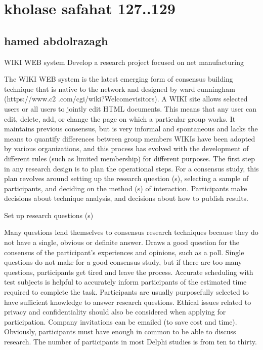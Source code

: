 \documentclass [7pt]{beamer}
\begin{document}
\small
\section*{kholase safahat 127..129 }
\subsection*{hamed abdolrazagh }	
\begin{frame}
\justifying	
WIKI WEB system  Develop a research project focused on net manufacturing
\begin{flushleft}
\justifying
The WIKI WEB system is the latest emerging form of consensus building technique that is native to the network and designed by ward cunningham (https://www.c2 .com/cgi/wiki?Welcomevisitors). A WIKI site allows selected users or all users to jointly edit HTML documents. This means that any user can edit, delete, add, or change the page on which a particular group works. It maintains previous consensus, but is very informal and spontaneous and lacks the means to quantify differences between group members WIKIs have been adopted by various organizations, and this process has evolved with the development of different rules (such as limited membership) for different purposes. The first step in any research design is to plan the operational steps. For a consensus study, this plan revolves around setting up the research question (s), selecting a sample of participants, and deciding on the method (s) of interaction. Participants make decisions about technique analysis, and decisions about how to publish results.
\end{flushleft}
\end{frame}

\begin{frame}
Set up research questions (s)
\begin{flushleft}
\justifying
Many questions lend themselves to consensus research techniques because they do not have a single, obvious or definite answer. Draws a good question for the consensus of the participant's experiences and opinions, such as a poll. Single questions do not make for a good consensus study, but if there are too many questions, participants get tired and leave the process. Accurate scheduling with test subjects is helpful to accurately inform participants of the estimated time required to complete the task. Participants are usually purposefully selected to have sufficient knowledge to answer research questions. Ethical issues related to privacy and confidentiality should also be considered when applying for participation. Company invitations can be emailed (to save cost and time). Obviously, participants must have enough in common to be able to discuss research. The number of participants in most Delphi studies is from ten to thirty.
\end{flushleft}
\end{frame}
\end{document}
